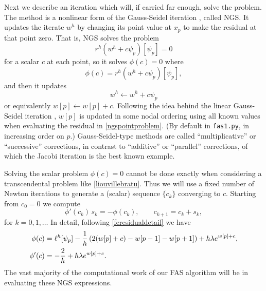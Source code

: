 \documentclass[letterpaper,final,12pt,reqno]{amsart}
\begin{document}
Next we describe an iteration which will, if carried far enough, solve the problem.  The method is a nonlinear form of the Gauss-Seidel iteration \cite{Briggsetal2000}, called NGS.  It updates the iterate $w^h$ by changing its point value at $x_p$ to make the residual at that point zero.  That is, NGS solves the problem
\begin{equation}
r^h(w^h + c \psi_p)[\psi_p] = 0  \label{ngspointproblem}
\end{equation}
for a scalar $c$ at each point, so it solves $\phi(c)=0$ where
\begin{equation}
  \phi(c) = r^h(w^h + c \psi_p)[\psi_p], \label{ngspointresidual}
\end{equation}
and then it updates
\begin{equation}
  w^h \leftarrow w^h + c \psi_p  \label{ngspointupdate}
\end{equation}
or equivalently $w[p] \leftarrow w[p] + c$.  Following the idea behind the linear Gauss-Seidel iteration \cite{Greenbaum1997}, $w[p]$ is updated in some nodal ordering using all known values when evaluating the residual in \eqref{ngspointproblem}.  (By default in \texttt{fas1.py}, in increasing order on $p$.)  Gauss-Seidel-type methods are called ``multiplicative'' \cite{Bueler2021} or ``successive'' \cite{GraeserKornhuber2009} corrections, in contrast to ``additive'' or ``parallel'' corrections, of which the Jacobi iteration \cite{Bueler2021} is the best known example.

Solving the scalar problem $\phi(c)=0$ cannot be done exactly when considering a transcendental problem like \eqref{liouvillebratu}.  Thus we will use a fixed number of Newton iterations \cite[Chapter 4]{Bueler2021} to generate a (scalar) sequence $\{c_k\}$ converging to $c$.  Starting from $c_0=0$ we compute
\begin{equation}
\phi'(c_k)\, s_k = -\phi(c_k),  \qquad  c_{k+1} = c_k + s_k, \label{ngsnewton}
\end{equation}
for $k=0,1,\dots$  In detail, following \eqref{feresidualdetail} we have
\begin{align}
   \phi(c) &= \ell^h[\psi_p] - \frac{1}{h} \left(2(w[p]+c) - w[p-1] - w[p+1]\right) + h \lambda e^{w[p]+c}, \label{ngsnewtondetails} \\
   \phi'(c) &= -\frac{2}{h} + h \lambda e^{w[p]+c}. \notag
\end{align}
The vast majority of the computational work of our FAS algorithm will be in evaluating these NGS expressions.
\end{document}
